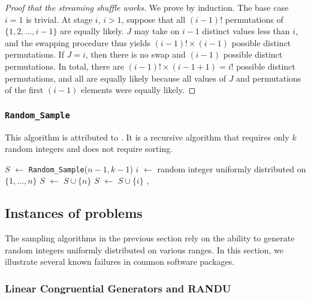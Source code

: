 \documentclass[12pt]{article}
\newcommand*\Let[2]{\State #1 $\gets$ #2}
\newcommand{\todo}[1]{{\color{red}{TO DO: \sc #1}}}
\begin{document}
\begin{proof}[Proof that the streaming shuffle works]
We prove by induction. The base case $i=1$ is trivial.
At stage $i$, $i>1$, suppose that all $(i-1)!$ permutations of $\{1, 2, \dots, i-1\}$ are equally likely.
$J$ may take on $i-1$ distinct values less than $i$, and the swapping procedure thus yields $(i-1)! \times (i-1)$
possible distinct permutations.
If $J = i$, then there is no swap and $(i-1)$ possible distinct permutations.
In total, there are $(i-1)! \times (i-1 + 1) = i!$ possible distinct permutations, and all are equally likely because
all values of $J$ and permutations of the first $(i-1)$ elements were equally likely.
\end{proof}


\subsubsection{\texttt{Random\_Sample}}
This algorithm is attributed to \citet{cormen_introduction_2009}.
It is a recursive algorithm that requires only $k$ random integers and does not require sorting.
\todo{prove by recursion that the method works}


\begin{algorithm}                      %
\caption{$Random\_Sample$}
\label{Random_Sample}
\begin{algorithmic}[1]               %
\Statex
{}
\Else
     \Let{$S$}{\texttt{Random\_Sample}($n-1, k-1$)}
     \Let{$i$}{random integer uniformly distributed on $\{1, \dots, n\}$} 
           \Let{$S$}{$S \cup \{n\}$}
     \Else
            \Let{$S$}{$S\cup\{i\}$}  
     \EndIf, 
\EndIf
\EndFunction
\end{algorithmic}
\end{algorithm}

\subsection{Instances of problems}
The sampling algorithms in the previous section rely on the ability to generate random integers uniformly distributed 
on various ranges.
In this section, we illustrate several known failures in common software packages.
 

\subsubsection{Linear Congruential Generators and RANDU}
\end{document}
